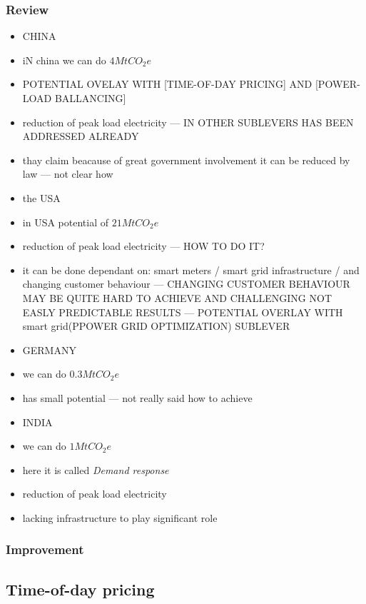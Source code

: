\documentclass[11pt, twocolumn]{article}
\begin{document}
\subsubsection{Review}
\begin{itemize}
\item CHINA
\item iN china we can do $4 Mt CO_2e$
\item POTENTIAL OVELAY WITH [TIME-OF-DAY PRICING] AND [POWER-LOAD BALLANCING]
\item reduction of peak load electricity --- IN OTHER SUBLEVERS HAS BEEN ADDRESSED ALREADY
\item thay claim beacause of great government involvement it can be reduced by law --- not clear how

\item the USA
\item in USA potential of $21 MtCO_2e$
\item reduction of peak load electricity --- HOW TO DO IT?
\item it can be done dependant on: smart meters / smart grid infrastructure / and changing customer behaviour --- CHANGING CUSTOMER BEHAVIOUR MAY BE QUITE HARD TO ACHIEVE AND CHALLENGING NOT EASLY PREDICTABLE RESULTS --- POTENTIAL OVERLAY WITH smart grid(PPOWER GRID OPTIMIZATION) SUBLEVER

\item GERMANY
\item we can do $0.3 Mt CO_2e$
\item has small potential --- not really said how to achieve

\item INDIA
\item we can do $1 Mt CO_2e$
\item here it is called \emph{Demand response}
\item reduction of peak load electricity
\item lacking infrastructure to play significant role


\end{itemize}
\subsubsection{Improvement}

\subsection{Time-of-day pricing}
\end{document}

